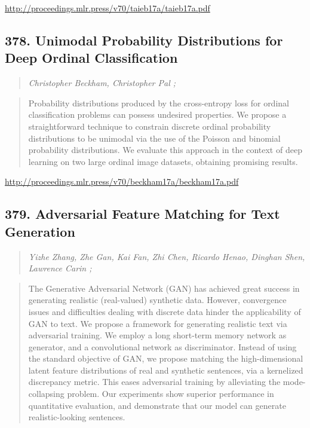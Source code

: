 \documentclass{article}
\begin{document}
\href{http://proceedings.mlr.press/v70/taieb17a/taieb17a.pdf}{http://proceedings.mlr.press/v70/taieb17a/taieb17a.pdf}

\subsection{378. Unimodal Probability Distributions for Deep Ordinal Classification}

\begin{quote}
\footnotesize{\textit{Christopher Beckham, Christopher Pal ;}}
\end{quote}

\begin{quote}
    Probability distributions produced by the cross-entropy loss for ordinal classification problems can possess undesired properties. We propose a straightforward technique to constrain discrete ordinal probability distributions to be unimodal via the use of the Poisson and binomial probability distributions. We evaluate this approach in the context of deep learning on two large ordinal image datasets, obtaining promising results.  \end{quote}

\href{http://proceedings.mlr.press/v70/beckham17a/beckham17a.pdf}{http://proceedings.mlr.press/v70/beckham17a/beckham17a.pdf}

\subsection{379. Adversarial Feature Matching for Text Generation}

\begin{quote}
\footnotesize{\textit{Yizhe Zhang, Zhe Gan, Kai Fan, Zhi Chen, Ricardo Henao, Dinghan Shen, Lawrence Carin ;}}
\end{quote}

\begin{quote}
    The Generative Adversarial Network (GAN) has achieved great success in generating realistic (real-valued) synthetic data. However, convergence issues and difficulties dealing with discrete data hinder the applicability of GAN to text. We propose a framework for generating realistic text via adversarial training. We employ a long short-term memory network as generator, and a convolutional network as discriminator. Instead of using the standard objective of GAN, we propose matching the high-dimensional latent feature distributions of real and synthetic sentences, via a kernelized discrepancy metric. This eases adversarial training by alleviating the mode-collapsing problem. Our experiments show superior performance in quantitative evaluation, and demonstrate that our model can generate realistic-looking sentences.  \end{quote}
\end{document}
